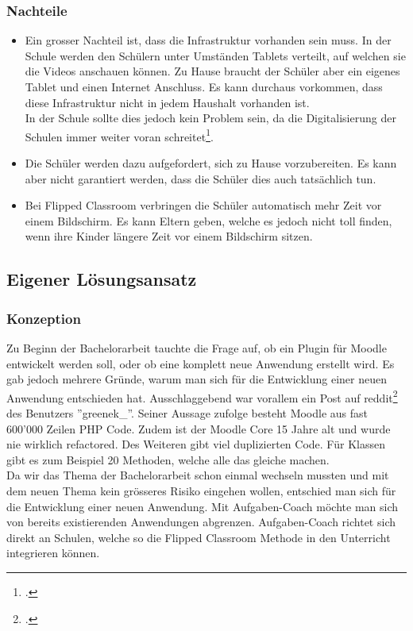 \subsubsection*{Nachteile}
\begin{itemize}
	\item Ein grosser Nachteil ist, dass die Infrastruktur vorhanden sein muss. In der Schule werden den Schülern unter Umständen Tablets verteilt, auf welchen sie die Videos anschauen können. Zu Hause braucht der Schüler aber ein eigenes Tablet und einen Internet Anschluss. Es kann durchaus vorkommen, dass diese Infrastruktur nicht in jedem Haushalt vorhanden ist. \\
	In der Schule sollte dies jedoch kein Problem sein, da die Digitalisierung der Schulen immer weiter voran schreitet\footcite{digitale_schule}.
	\item Die Schüler werden dazu aufgefordert, sich zu Hause vorzubereiten. Es kann aber nicht garantiert werden, dass die Schüler dies auch tatsächlich tun.
	\item Bei Flipped Classroom verbringen die Schüler automatisch mehr Zeit vor einem Bildschirm. Es kann Eltern geben, welche es jedoch nicht toll finden, wenn ihre Kinder längere Zeit vor einem Bildschirm sitzen.
\end{itemize}

\subsection{Eigener Lösungsansatz}
\subsubsection{Konzeption}

Zu Beginn der Bachelorarbeit tauchte die Frage auf, ob ein Plugin für Moodle entwickelt werden soll, oder ob eine komplett neue Anwendung erstellt wird. Es gab jedoch mehrere Gründe, warum man sich für die Entwicklung einer neuen Anwendung entschieden hat. Ausschlaggebend war vorallem ein Post auf reddit\footcite{moodle_bericht} des Benutzers ''greenek\_''. Seiner Aussage zufolge besteht Moodle aus fast 600'000 Zeilen PHP Code. Zudem ist der Moodle Core 15 Jahre alt und wurde nie wirklich refactored. Des Weiteren gibt viel duplizierten Code. Für Klassen gibt es zum Beispiel 20 Methoden, welche alle das gleiche machen. \\

Da wir das Thema der Bachelorarbeit schon einmal wechseln mussten und mit dem neuen Thema kein grösseres Risiko eingehen wollen, entschied man sich für die Entwicklung einer neuen Anwendung. Mit Aufgaben-Coach möchte man sich von bereits existierenden Anwendungen abgrenzen. Aufgaben-Coach richtet sich direkt an Schulen, welche so die Flipped Classroom Methode in den Unterricht integrieren können. \\

